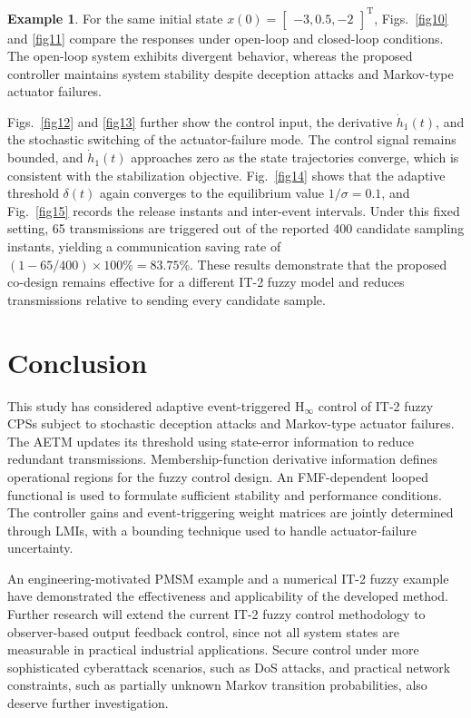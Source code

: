 \documentclass[preprint,review,fleqn,sort&compress,3p]{elsarticle}
\theoremstyle{definition} %
\theoremstyle{definition}%
\newtheorem{example}{Example}
\begin{document}
\begin{example}
For the same initial state $x(0) = \begin{bmatrix} -3, 0.5, -2 \end{bmatrix}^{\mathrm{T}}$, Figs.~\ref{fig10} and \ref{fig11} compare the responses under open-loop and closed-loop conditions. The open-loop system exhibits divergent behavior, whereas the proposed controller maintains system stability despite deception attacks and Markov-type actuator failures.

Figs.~\ref{fig12} and \ref{fig13} further show the control input, the derivative $\dot{h}_1(t)$, and the stochastic switching of the actuator-failure mode. The control signal remains bounded, and $\dot{h}_1(t)$ approaches zero as the state trajectories converge, which is consistent with the stabilization objective.
Fig.~\ref{fig14} shows that the adaptive threshold $\delta(t)$ again converges to the equilibrium value $1/\sigma = 0.1$, and Fig.~\ref{fig15} records the release instants and inter-event intervals. Under this fixed setting, 65 transmissions are triggered out of the reported 400 candidate sampling instants, yielding a communication saving rate of $(1-65/400)\times100\%=83.75\%$. These results demonstrate that the proposed co-design remains effective for a different IT-2 fuzzy model and reduces transmissions relative to sending every candidate sample.

\end{example}

\section{Conclusion} \label{sec5}
This study has considered adaptive event-triggered $\mathrm{H}_{\infty}$ control of IT-2 fuzzy CPSs subject to stochastic deception attacks and Markov-type actuator failures. The AETM updates its threshold using state-error information to reduce redundant transmissions. Membership-function derivative information defines operational regions for the fuzzy control design. An FMF-dependent looped functional is used to formulate sufficient stability and performance conditions. The controller gains and event-triggering weight matrices are jointly determined through LMIs, with a bounding technique used to handle actuator-failure uncertainty.

An engineering-motivated PMSM example and a numerical IT-2 fuzzy example have demonstrated the effectiveness and applicability of the developed method. Further research will extend the current IT-2 fuzzy control methodology to observer-based output feedback control, since not all system states are measurable in practical industrial applications. Secure control under more sophisticated cyberattack scenarios, such as DoS attacks, and practical network constraints, such as partially unknown Markov transition probabilities, also deserve further investigation.
\end{document}
